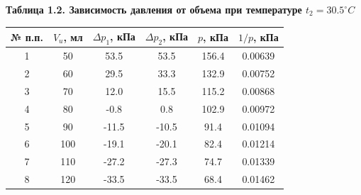 \documentclass[12pt]{article}
\begin{document}
\begin{flushleft}
    \begin{center}
        \textbf{Таблица 1.2. Зависимость давления от объема при температуре $ t_2 = 30.5^\circ C $} \\
    \end{center}
    \begin{table}[h]
        \centering
        \begin{tabular}{|c|c|c|c|c|c|}
            \hline
            № п.п. & $ V_u $, мл & $ \Delta p_1 $, кПа & $ \Delta p_2 $, кПа & $ p $, кПа & $ 1/p $, кПа \\
            \hline
            1  & 50  & 53.5  & 53.5  & 156.4 & 0.00639 \\
            \hline
            2  & 60  & 29.5  & 33.3  & 132.9 & 0.00752 \\
            \hline
            3  & 70  & 12.0  & 15.5  & 115.2 & 0.00868 \\
            \hline
            4  & 80  & -0.8  & 0.8   & 102.9 & 0.00972 \\
            \hline
            5  & 90  & -11.5 & -10.5 & 91.4  & 0.01094 \\
            \hline
            6  & 100 & -19.1 & -20.1 & 82.4  & 0.01214 \\
            \hline
            7  & 110 & -27.2 & -27.3 & 74.7  & 0.01339 \\
            \hline
            8  & 120 & -33.5 & -33.5 & 68.4  & 0.01462 \\
            \hline
        \end{tabular}    
    \end{table}


\end{flushleft}
\end{document}
